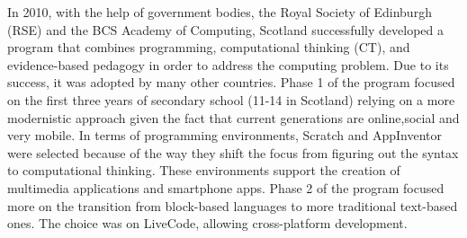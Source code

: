 In 2010, with the help of government bodies, the Royal Society of Edinburgh
(RSE) and the BCS Academy of Computing, Scotland successfully developed a program that combines programming, computational thinking (CT), and evidence-based pedagogy in order to address the computing problem. Due to its success, it was adopted by many other countries. Phase 1 of the program focused on the first three years of secondary school (11-14 in Scotland) relying on a more modernistic approach given the fact that current generations are online,social and very mobile. In terms of programming environments, Scratch and AppInventor were selected because of the way they shift the focus from figuring out the syntax to computational thinking. These environments support the creation of multimedia applications and smartphone apps. Phase 2 of the program focused more on the transition from block-based languages to more traditional text-based ones. The choice was on LiveCode, allowing cross-platform development.




